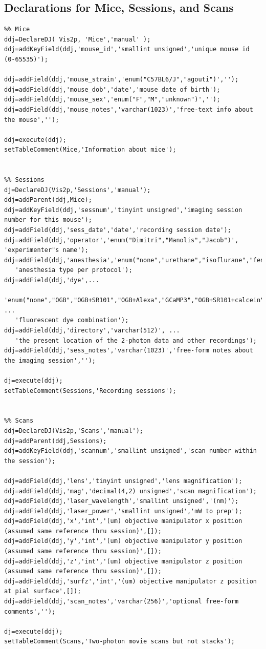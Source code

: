 \documentclass[10pt]{article}
\begin{document}
\subsection{Declarations for Mice, Sessions, and Scans}
\begin{lstlisting}
%% Mice 
ddj=DeclareDJ( Vis2p, 'Mice','manual' );
ddj=addKeyField(ddj,'mouse_id','smallint unsigned','unique mouse id (0-65535)');

ddj=addField(ddj,'mouse_strain','enum("C57BL6/J","agouti")','');
ddj=addField(ddj,'mouse_dob','date','mouse date of birth');
ddj=addField(ddj,'mouse_sex','enum("F","M","unknown")','');
ddj=addField(ddj,'mouse_notes','varchar(1023)','free-text info about the mouse','');

ddj=execute(ddj);
setTableComment(Mice,'Information about mice');


%% Sessions
dj=DeclareDJ(Vis2p,'Sessions','manual');
ddj=addParent(ddj,Mice);
ddj=addKeyField(ddj,'sessnum','tinyint unsigned','imaging session number for this mouse');
ddj=addField(ddj,'sess_date','date','recording session date');
ddj=addField(ddj,'operator','enum("Dimitri","Manolis","Jacob")', 'experimenter"s name');
ddj=addField(ddj,'anesthesia','enum("none","urethane","isoflurane","fentanyl")',...
   'anesthesia type per protocol');
ddj=addField(ddj,'dye',...
   'enum("none","OGB","OGB+SR101","OGB+Alexa","GCaMP3","OGB+SR101+calcein")', ...
   'fluorescent dye combination');
ddj=addField(ddj,'directory','varchar(512)', ...
   'the present location of the 2-photon data and other recordings');
ddj=addField(ddj,'sess_notes','varchar(1023)','free-form notes about the imaging session','');

dj=execute(ddj);
setTableComment(Sessions,'Recording sessions');


%% Scans
ddj=DeclareDJ(Vis2p,'Scans','manual');
ddj=addParent(ddj,Sessions);
ddj=addKeyField(ddj,'scannum','smallint unsigned','scan number within the session');

ddj=addField(ddj,'lens','tinyint unsigned','lens magnification');
ddj=addField(ddj,'mag','decimal(4,2) unsigned','scan magnification');
ddj=addField(ddj,'laser_wavelength','smallint unsigned','(nm)');
ddj=addField(ddj,'laser_power','smallint unsigned','mW to prep');
ddj=addField(ddj,'x','int','(um) objective manipulator x position (assumed same reference thru session)',[]);
ddj=addField(ddj,'y','int','(um) objective manipulator y position (assumed same reference thru session)',[]);
ddj=addField(ddj,'z','int','(um) objective manipulator z position (assumed same reference thru session)',[]);
ddj=addField(ddj,'surfz','int','(um) objective manipulator z position at pial surface',[]);
ddj=addField(ddj,'scan_notes','varchar(256)','optional free-form comments','');

dj=execute(ddj);
setTableComment(Scans,'Two-photon movie scans but not stacks');
\end{lstlisting}
\end{document}
